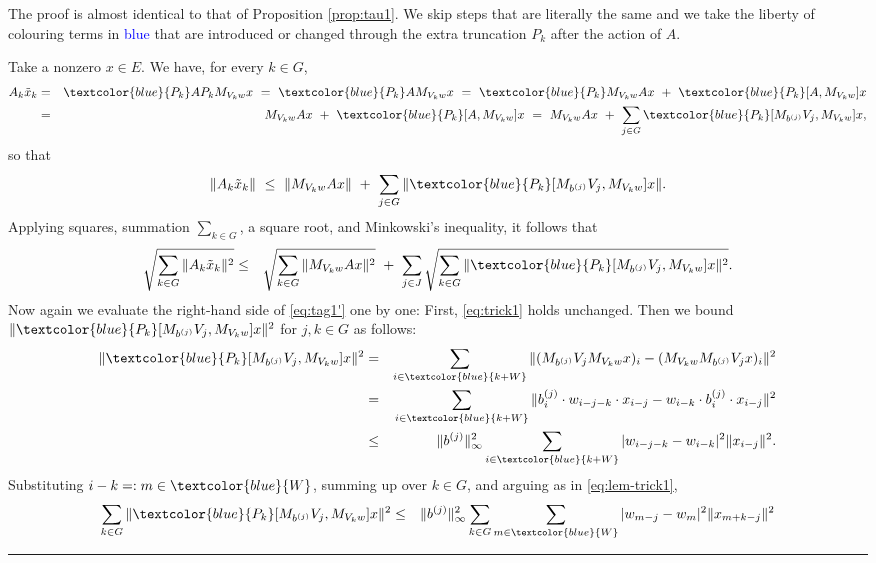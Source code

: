 \documentclass{article}
\newcommand\Proofend{\rule{2mm}{2mm}}
\renewenvironment{proof}
 {\par\noindent{\bf Proof.}}
 {\Proofend\par\pagebreak[2]}
\numberwithin{equation}{section}   %
\numberwithin{figure}{section}  %
\begin{document}
\begin{proof}
The proof is almost identical to that of Proposition \ref{prop:tau1}. We skip steps that are literally the same and we take the liberty of colouring terms in \textcolor{blue}{blue} that are introduced or changed through the extra truncation $P_k$ after the action of $A$.

Take a nonzero $x\in E$. We have, for every $k\in G$,
\begin{eqnarray*}
A_k\tilde x_k &=& \textcolor{blue}{P_k}AP_kM_{V_kw}x\ =\ \textcolor{blue}{P_k}AM_{V_kw}x \ =\ \textcolor{blue}{P_k}M_{V_kw}Ax\ +\ \textcolor{blue}{P_k}[A,M_{V_kw}]x\\
&=& M_{V_kw}Ax\ +\ \textcolor{blue}{P_k}[A,M_{V_kw}]x
\ =\ M_{V_kw}Ax\ +\ \sum_{j\in G} \textcolor{blue}{P_k}[M_{b^{(j)}}V_j,M_{V_kw}]x,
\end{eqnarray*}
so that
\[
\|A_k\tilde x_k\| \ \le\ \|M_{V_kw}Ax\|\ +\ \sum_{j\in G} \|\textcolor{blue}{P_k}[M_{b^{(j)}}V_j,M_{V_kw}]x\|.
\]
Applying squares, summation $\sum_{k\in G}$, a square root, and Minkowski's inequality, it follows that 
\begin{eqnarray}
\sqrt{\sum_{k\in G} \|A_k\tilde x_k\|^2} &\le&
 \sqrt{\sum_{k\in G}\|M_{V_kw}Ax\|^2}\ +\ \sum_{j\in J}\sqrt{\sum_{k\in G}\|\textcolor{blue}{P_k}[M_{b^{(j)}}V_j,M_{V_kw}]x\|^2} \label{eq:tag1'}.
\end{eqnarray}
%
Now again we evaluate the right-hand side of \eqref{eq:tag1'} one by one: First, \eqref{eq:trick1} holds unchanged.
%
Then we bound $\|\textcolor{blue}{P_k}[M_{b^{(j)}}V_j,M_{V_kw}]x\|^2$ for $j,k\in G$ as follows: 
\begin{eqnarray*}
 \|\textcolor{blue}{P_k}[M_{b^{(j)}}V_j,M_{V_kw}]x\|^2 &=& \sum_{i\in \textcolor{blue}{k+W}}\|(M_{b^{(j)}}V_jM_{V_kw}x)_i-(M_{V_kw}M_{b^{(j)}}V_jx)_i\|^2\\
&=& \sum_{i\in \textcolor{blue}{k+W}}\|b^{(j)}_i\cdot  w_{i-j-k}\cdot x_{i-j}-w_{i-k}\cdot b^{(j)}_i\cdot x_{i-j}\|^2\\
&\le& \|b^{(j)}\|_\infty^2\sum_{i\in \textcolor{blue}{k+W}} |w_{i-j-k}-w_{i-k}|^2\|x_{i-j}\|^2.
\end{eqnarray*}
%
Substituting $i-k=:m\in \textcolor{blue}{W}$, summing up over $k\in G$, and arguing as in \eqref{eq:lem-trick1},
%
\begin{eqnarray}
\sum_{k\in G} \|\textcolor{blue}{P_k}[M_{b^{(j)}}V_j,M_{V_kw}]x\|^2 &\le& \|b^{(j)}\|_\infty^2 \sum_{k\in G} \sum_{m\in \textcolor{blue}{W}} |w_{m-j}-w_{m}|^2\|x_{m+k-j}\|^2 \nonumber\\

\end{eqnarray}
\end{proof}
\end{document}
